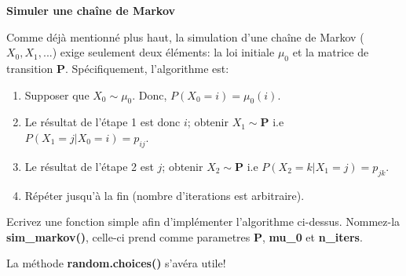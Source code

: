\begin{Exercice}[20 minutes]\textbf{Simuler une chaîne de Markov}

Comme déjà mentionné plus haut, la simulation d'une chaîne de Markov ($X_0, X_1, ...$) exige seulement deux éléments: la loi initiale $\mu_0$ et la matrice de transition $\mathbf{P}$. Spécifiquement, l'algorithme est:

\begin{enumerate}
    \item Supposer que $X_0 \sim \mu_0$. Donc, $P(X_0=i)=\mu_0(i)$.
    \item Le résultat de l'étape 1 est donc $i$; obtenir $X_1 \sim \mathbf{P}$ i.e $P(X_1=j|X_0=i)=p_{ij}$.
    \item Le résultat de l'étape 2 est $j$; obtenir $X_2 \sim \mathbf{P}$ i.e $P(X_2=k|X_1=j)=p_{jk}$.
    \item Répéter jusqu'à la fin (nombre d'iterations est arbitraire).
\end{enumerate}

Ecrivez une fonction simple afin d'implémenter l'algorithme ci-dessus. Nommez-la \textbf{sim\_markov()}, celle-ci prend comme parametres \textbf{P}, \textbf{mu\_0} et \textbf{n\_iters}.



\begin{conseil}
    La méthode \textbf{random.choices()} s'avéra utile!
\end{conseil}
\begin{solution}

\end{solution}
\end{Exercice}

